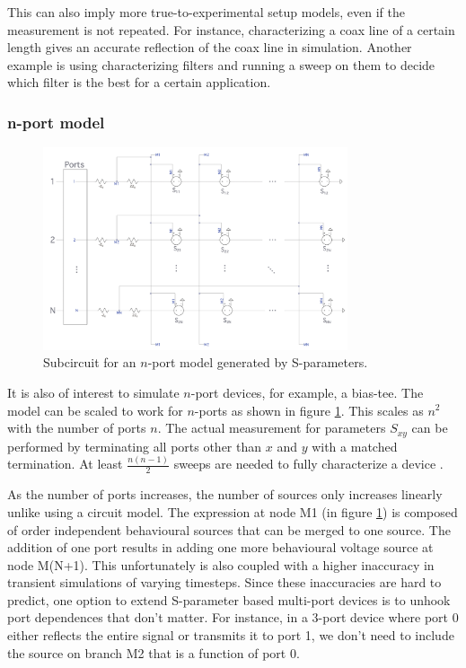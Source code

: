 \documentclass[]{article}
\newcommand{\cf}[1]{\textsf{#1}}
\begin{document}
This can also imply more true-to-experimental setup models, even if the measurement is not repeated.
For instance, characterizing a coax line of a certain length gives an accurate reflection of the coax line
in simulation. Another example is using characterizing filters and running a sweep on them to
decide which filter is the best for a certain application.

\subsubsection{n-port model}

\begin{figure}
    \centering
    \includegraphics[width=0.8\textwidth]{figs/nport.png}
    \caption{Subcircuit for an $n$-port model generated by S-parameters.}
    \label{fig:nport}
\end{figure}

It is also of interest to simulate $n$-port devices, for example, a bias-tee. 
The model can be
scaled to work for $n$-ports as shown in figure \ref{fig:nport}. This scales as $n^2$ with
the number of ports $n$. The actual measurement for parameters $S_{xy}$ can be performed 
by terminating all ports other than $x$ and $y$ with a matched termination. At least
$\frac{n(n-1)}{2}$ sweeps are needed to fully characterize a device \cite{measuring_nport}.

As the number of
ports increases, the number of sources only increases linearly unlike using a circuit 
model. The expression at node \cf{M1} (in figure \ref{fig:nport}) is composed of order independent behavioural
sources that can be merged to one source. The addition of one port results in
adding one more behavioural voltage source at node \cf{M(N+1)}. 
This unfortunately is also coupled with a higher inaccuracy in transient simulations
of varying timesteps. Since these inaccuracies are hard to predict, one option to
extend S-parameter based multi-port devices is to unhook port dependences that don't
matter. For instance, in a 3-port device where port 0 either reflects the entire
signal or transmits it to port 1, we don't need to include the source on branch \cf{M2}
that is a function of port 0.
\end{document}
